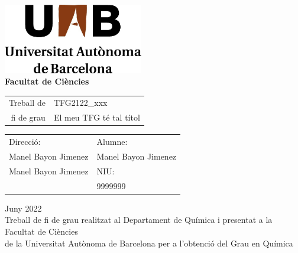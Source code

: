 \documentclass[11pt]{article}
\newcommand\NomComplet{Manel Bayon Jimenez}
\newcommand\NIU{9999999}
\newcommand\NomProfeA{Manel Bayon Jimenez}
\newcommand\NomProfeB{Manel Bayon Jimenez}
\newcommand\CodiTFG{TFG2122\_xxx}
\newcommand\TitolTFG{El meu TFG té tal títol}
\newcommand\NomCentre{Departament de Química } %
\newcommand\NomGrau{Química}
\newcommand\Mes{Juny } %
\newcommand\Any{2022}
\begin{document}
\begin{titlepage}

\center %


\includegraphics[width = 6.1cm]{nom_uab.jpg}\\[1.76cm] %


\textbf{\LARGE Facultat de Ciències}\\[3.53cm] %
\begin{flushright}
\begin{tabular}{r | p{}}
  {\Large Treball de} & {\LARGE \CodiTFG}\\
  {\LARGE fi de grau}  & {\LARGE \TitolTFG}
\end{tabular}
\end{flushright}\vspace{7.06cm}




\begin{tabular}{p{} p{}}
\large
Direcció: & Alumne: \\
\NomProfeA & \NomComplet\\
\NomProfeB & NIU: \\
 & \NIU
\end{tabular}
\vspace{0.7cm}



{\large \Mes \Any}\\[1.4cm] %

Treball de fi de grau realitzat al \NomCentre i presentat a la\\ Facultat de Ciències\\ de la Universitat Autònoma de Barcelona per a l'obtenció del Grau en \NomGrau


\end{titlepage}
\end{document}
